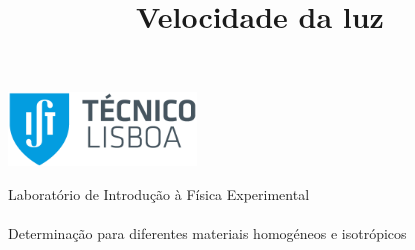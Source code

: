 \thispagestyle {empty}
\begin{center}
\begin{minipage}[c][5cm][t]{\textwidth}
\begin{center}
\includegraphics[width=5cm]{../IST_A_RGB_POS.png}
\end{center}

\end{minipage}
\begin{minipage}[t][10cm][c]{\textwidth}
\centering
{\FontMb Laboratório de Introdução à Física Experimental} \\
\paragraph{}
\centering
{\FontLb\Huge \title{Velocidade da luz}}
\paragraph{}
{\FontMb Determinação para diferentes materiais homogéneos e isotrópicos} \\
\paragraph{}
{}
\end{minipage}

\begin{minipage}[c][1.5cm][c]{\textwidth}
\centering
{\FontLn }
\end{minipage}

\begin{minipage}[c][1.5cm][c]{\textwidth}
\centering



\end{minipage}
\begin{minipage}[c][3cm][c]{\textwidth}
\centering
\renewcommand{\arraystretch}{1.4}

\maketitle

\vspace{-5mm}
\hline
\vspace{-3mm}
\begin{center}
\centering

\end{center}
\end{minipage}
\end{center}

